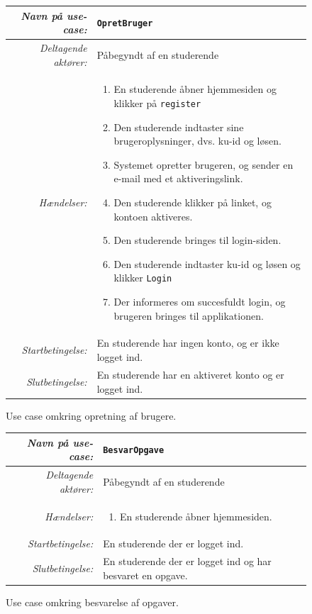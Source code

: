 \documentclass[12pt]{article}
\begin{document}
\begin{figure}[htpb]
    \centering
    \begin{tabular}{r p{10cm}}
        \toprule
        \textit{Navn på use-case:} & \verb!OpretBruger! \\
        \hline
        \textit{Deltagende aktører:} & Påbegyndt af en studerende \\
        \hline
        \textit{Hændelser:} & \begin{enumerate}[nolistsep]
            \item En studerende åbner hjemmesiden og klikker på \verb!register!
            \item Den studerende indtaster sine brugeroplysninger, dvs. ku-id og løsen.
            \item Systemet opretter brugeren, og sender en e-mail med et aktiveringslink.
            \item Den studerende klikker på linket, og kontoen aktiveres.
            \item Den studerende bringes til login-siden.
            \item Den studerende indtaster ku-id og løsen og klikker \verb!Login!
            \item Der informeres om succesfuldt login, og brugeren bringes til applikationen.
        \end{enumerate}  \\
        \hline
        \textit{Startbetingelse:} & En studerende har ingen konto, og er ikke logget ind. \\
        \hline
        \textit{Slutbetingelse:} & En studerende har en aktiveret konto og er logget ind. \\
        \bottomrule
    \end{tabular}
    \caption{Use case omkring opretning af brugere.}
    \label{fig:use_case1}
\end{figure}

\begin{figure}[htpb]
    \centering
    \begin{tabular}{r p{10cm}}
        \toprule
        \textit{Navn på use-case:} & \verb!BesvarOpgave! \\
        \hline
        \textit{Deltagende aktører:} & Påbegyndt af en studerende \\
        \hline
        \textit{Hændelser:} & \begin{enumerate}[nolistsep]
            \item En studerende åbner hjemmesiden.
        \end{enumerate}  \\
        \hline
        \textit{Startbetingelse:} & En studerende der er logget ind. \\
        \hline
        \textit{Slutbetingelse:} & En studerende der er logget ind og har besvaret en opgave. \\
        \bottomrule
    \end{tabular}
    \caption{Use case omkring besvarelse af opgaver.}
    \label{fig:use_case1}
\end{figure}
\end{document}
